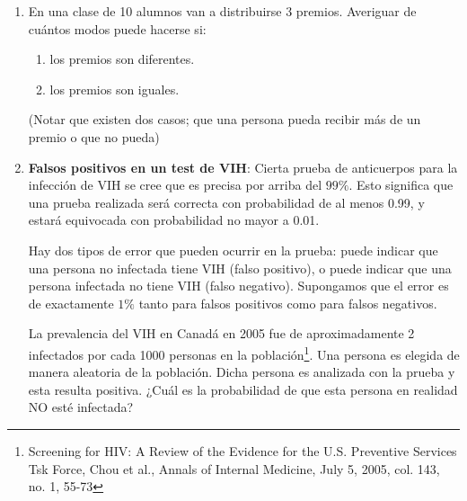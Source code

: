 \documentclass{article}
\renewcommand{\P}[1]{P\left(#1\right)}
\begin{document}
\begin{enumerate}
\begin{proof}[Solución]
\begin{enumerate}
    \[\P{A_6}=\frac{6}{6^5}=\frac{1}{1296}.\]
    
\end{enumerate}

    \end{proof}

    \item En una clase de 10 alumnos van a distribuirse 3 premios. Averiguar de cuántos modos puede hacerse si:

    \begin{enumerate}
        \item los premios son diferentes.
        \item los premios son iguales.
    \end{enumerate}

    (Notar que existen dos casos; que una persona pueda recibir más de un premio o que no pueda)



    \item \textbf{Falsos positivos en un test de VIH}: Cierta prueba de anticuerpos para la infección de VIH se cree que es precisa por arriba del $99\%$. Esto significa que una prueba realizada será correcta con probabilidad de al menos 0.99, y estará equivocada con probabilidad no mayor a 0.01. 
    
    Hay dos tipos de error que pueden ocurrir en la prueba: puede indicar que una persona no infectada tiene VIH (falso positivo), o puede indicar que una persona infectada no tiene VIH (falso negativo). Supongamos que el error es de exactamente $1\%$ tanto para falsos positivos como para falsos negativos.
    
    La prevalencia del VIH en Canadá en 2005 fue de aproximadamente 2 infectados por cada 1000 personas en la población\footnote[1]{Screening for HIV: A Review of the Evidence for the U.S. Preventive Services Tsk Force, Chou et al., Annals of Internal Medicine, July 5, 2005, col. 143, no. 1, 55-73}. Una persona es elegida de manera aleatoria de la población. Dicha persona es analizada con la prueba y esta resulta positiva. ¿Cuál es la probabilidad de que esta persona en realidad NO esté infectada?
\end{enumerate}
\end{document}
